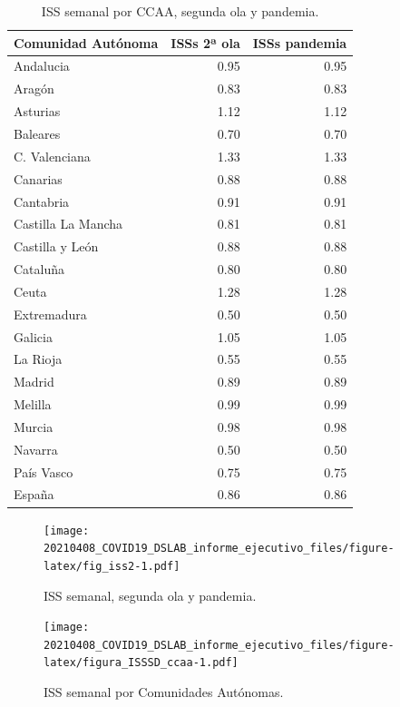 \documentclass[
  11pt,
]{article}
\begin{document}
\begin{table}[!h]

\caption{\label{tab:tabla2}ISS semanal por CCAA, segunda ola y pandemia.}
\centering
\fontsize{9}{11}\selectfont
\begin{tabular}[t]{l|r|r}
\hline
Comunidad Autónoma & ISSs 2ª ola & ISSs pandemia\\
\hline
Andalucia & 0.95 & 0.95\\
\hline
Aragón & 0.83 & 0.83\\
\hline
Asturias & 1.12 & 1.12\\
\hline
Baleares & 0.70 & 0.70\\
\hline
C. Valenciana & 1.33 & 1.33\\
\hline
Canarias & 0.88 & 0.88\\
\hline
Cantabria & 0.91 & 0.91\\
\hline
Castilla La Mancha & 0.81 & 0.81\\
\hline
Castilla y León & 0.88 & 0.88\\
\hline
Cataluña & 0.80 & 0.80\\
\hline
Ceuta & 1.28 & 1.28\\
\hline
Extremadura & 0.50 & 0.50\\
\hline
Galicia & 1.05 & 1.05\\
\hline
La Rioja & 0.55 & 0.55\\
\hline
Madrid & 0.89 & 0.89\\
\hline
Melilla & 0.99 & 0.99\\
\hline
Murcia & 0.98 & 0.98\\
\hline
Navarra & 0.50 & 0.50\\
\hline
País Vasco & 0.75 & 0.75\\
\hline
España & 0.86 & 0.86\\
\hline
\end{tabular}
\end{table}

\begin{figure}
\centering
\texttt{[image: 20210408\_COVID19\_DSLAB\_informe\_ejecutivo\_files/figure-latex/fig\_iss2-1.pdf]}
\caption{\label{fig:fig_iss2} ISS semanal, segunda ola y pandemia.}
\end{figure}

\begin{figure}
\centering
\texttt{[image: 20210408\_COVID19\_DSLAB\_informe\_ejecutivo\_files/figure-latex/figura\_ISSSD\_ccaa-1.pdf]}
\caption{\label{fig:figura_ISSSD_ccaa} ISS semanal por Comunidades
Autónomas.}
\end{figure}
\end{document}

